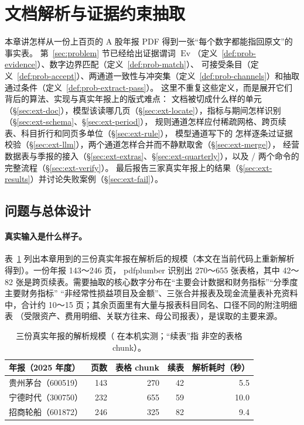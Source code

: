 \section{文档解析与证据约束抽取}
\label{sec:extract}

本章讲\sysname{}怎样从一份上百页的 A 股年报 PDF 得到一张“每个数字都能指回原文”的事实表。
第~\ref{sec:problem} 节已经给出证据谓词 $\operatorname{Ev}$（定义~\ref{def:prob-evidence}）、数字边界匹配（定义~\ref{def:prob-match}）、
可接受条目（定义~\ref{def:prob-accept}）、两通道一致性与冲突集（定义~\ref{def:prob-channels}）和抽取通过条件（定义~\ref{def:prob-extract-pass}）。
这里不重复这些定义，而是展开它们背后的算法、实现与真实年报上的版式难点：
文档被切成什么样的单元（\S\ref{sec:ext-doc}），模型该读哪几页（\S\ref{sec:ext-locate}），指标与期间怎样识别（\S\ref{sec:ext-schema}、\S\ref{sec:ext-period}），
规则通道怎样应付稀疏网格、跨页续表、科目折行和同页多单位（\S\ref{sec:ext-rule}），
模型通道写下的  怎样逐条过证据校验（\S\ref{sec:ext-llm}），两个通道怎样合并而不静默取舍（\S\ref{sec:ext-merge}），
经营数据表与季报的接入（\S\ref{sec:ext-extras}、\S\ref{sec:ext-quarterly}），以及  /  两个命令的完整流程（\S\ref{sec:ext-verify}）。
最后报告三家真实年报上的结果（\S\ref{sec:ext-results}）并讨论失败案例（\S\ref{sec:ext-fail}）。

\subsection{问题与总体设计}
\label{sec:ext-overview}

\paragraph{真实输入是什么样子。}
表~\ref{tab:ext-docs} 列出本章用到的三份真实年报在解析后的规模（本文在当前代码上重新解析得到）。一份年报 143～246 页，
pdfplumber 识别出 270～655 张表格，其中 42～82 张是跨页续表。需要抽取的核心数字分布在“主要会计数据和财务指标”“分季度主要财务指标”
“非经常性损益项目及金额”、三张合并报表及现金流量表补充资料中，合计约 10～15 页；其余页面里有大量与报表科目同名、口径不同的附注明细表
（受限资产、费用明细、关联方往来、母公司报表），是误取的主要来源。

\begin{table}[t]
\centering
\caption{三份真实年报的解析规模（ 在本机实测；“续表”指  非空的表格 chunk）。}
\label{tab:ext-docs}
\small
\begin{tabular}{lrrrr}
\toprule
年报（2025 年度） & 页数 & 表格 chunk & 续表 & 解析耗时（秒） \\
\midrule
贵州茅台（600519） & 143 & 270 & 42 & 5.5 \\
宁德时代（300750） & 232 & 655 & 59 & 10.0 \\
招商轮船（601872） & 246 & 325 & 82 & 9.4 \\
\bottomrule
\end{tabular}
\end{table}

